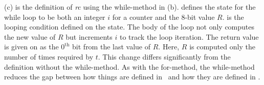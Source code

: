 (c) is the definition of \emph{rc} using the while-method in (b).
 defines the state for the while loop to be both an integer $i$ for a counter and the 8-bit value $R$.
 is the looping condition defined on the state.
The body of the loop not only computes the new value of $R$ but  increments $i$ to track the loop iteration.
The return value is given on  as the $0^\mathrm{th}$ bit from the last value of $R$.
Here, $R$ is computed only the number of times required by $t$.
This change differs significantly from the definition without the while-method.
As with the for-method, the while-method reduces the gap between how things are defined in \fips\ and how they are defined in \cryptol.
